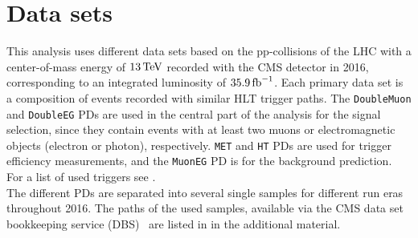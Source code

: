 \section{Data sets}\label{sec:datasets}
This analysis uses different data sets based on the pp-collisions of the LHC with a center-of-mass energy of $13\,\text{Te\hspace{-.08em}V}$ recorded with the CMS detector in 2016, corresponding to an integrated luminosity of $35.9\mbox{\ensuremath{\,\text{fb}^\text{$-$1}}}$. Each primary data set is a composition of events recorded with similar HLT trigger paths. The \texttt{DoubleMuon} and \texttt{DoubleEG} PDs are used in the central part of the analysis for the signal selection, since they contain events with at least two muons or electromagnetic objects (electron or photon), respectively. \texttt{MET} and \texttt{HT} PDs are used for trigger efficiency measurements, and the \texttt{MuonEG} PD is for the background prediction. For a list of used triggers see .\\
The different PDs are separated into several single samples for different run eras throughout 2016.
The paths of the used samples, available via the CMS data set bookkeeping service (DBS)~\cite{DASBookkeeping} are listed in  in the additional material.




